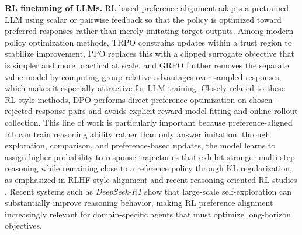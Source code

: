 \textbf{RL finetuning of LLMs.} RL-based preference alignment \cite{ouyang2022traininglanguagemodels} adapts a pretrained LLM using scalar or pairwise feedback so that the policy is optimized toward preferred responses rather than merely imitating target outputs. Among modern policy optimization methods, TRPO \cite{schulman2015trustregionpolicyoptimization} constrains updates within a trust region to stabilize improvement, PPO \cite{schulman2017proximalpolicyoptimizationalgorithms} replaces this with a clipped surrogate objective that is simpler and more practical at scale, and GRPO \cite{shao2024deepseekmath} further removes the separate value model by computing group-relative advantages over sampled responses, which makes it especially attractive for LLM training. Closely related to these RL-style methods, DPO \cite{rafailov2023directpreferenceoptimization} performs direct preference optimization on chosen--rejected response pairs and avoids explicit reward-model fitting and online rollout collection. This line of work is particularly important because preference-aligned RL can train reasoning ability rather than only answer imitation: through exploration, comparison, and preference-based updates, the model learns to assign higher probability to response trajectories that exhibit stronger multi-step reasoning while remaining close to a reference policy through KL regularization, as emphasized in RLHF-style alignment and recent reasoning-oriented RL studies \cite{ouyang2022traininglanguagemodels,shao2024deepseekmath,guo2025deepseekr1}. Recent systems such as \textit{DeepSeek-R1} \cite{guo2025deepseekr1} show that large-scale self-exploration can substantially improve reasoning behavior, making RL preference alignment increasingly relevant for domain-specific agents that must optimize long-horizon objectives.
